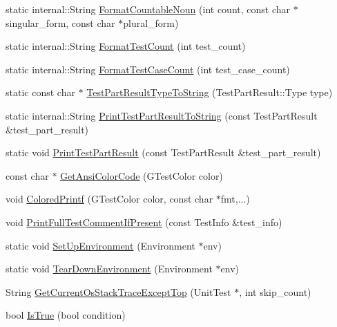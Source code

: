 \begin{DoxyCompactItemize}
\item 
static internal\-::\-String \hyperlink{namespacetesting_aefca65bdfcf981c1e55c7d90e14a263f}{\-Format\-Countable\-Noun} (int count, const char $\ast$singular\-\_\-form, const char $\ast$plural\-\_\-form)
\item 
static internal\-::\-String \hyperlink{namespacetesting_a9e35e748b0be521a7c14047d3cab12b2}{\-Format\-Test\-Count} (int test\-\_\-count)
\item 
static internal\-::\-String \hyperlink{namespacetesting_a62a889fb8f600d386c9c75951b0a45b7}{\-Format\-Test\-Case\-Count} (int test\-\_\-case\-\_\-count)
\item 
static const char $\ast$ \hyperlink{namespacetesting_a3095c11c161dad676777579f3619d016}{\-Test\-Part\-Result\-Type\-To\-String} (\-Test\-Part\-Result\-::\-Type type)
\item 
static internal\-::\-String \hyperlink{namespacetesting_aa72a7aad5f2a9ccde41699f09348160a}{\-Print\-Test\-Part\-Result\-To\-String} (const \-Test\-Part\-Result \&test\-\_\-part\-\_\-result)
\item 
static void \hyperlink{namespacetesting_af2baf2fe4307d85e2124466614b0108a}{\-Print\-Test\-Part\-Result} (const \-Test\-Part\-Result \&test\-\_\-part\-\_\-result)
\item 
const char $\ast$ \hyperlink{namespacetesting_1_1internal_a381864cc8cad6df85e53dcee3b0cea92}{\-Get\-Ansi\-Color\-Code} (\-G\-Test\-Color color)
\item 
void \hyperlink{namespacetesting_1_1internal_a50a94fd99435d0a4dc57b7ca17860d92}{\-Colored\-Printf} (\-G\-Test\-Color color, const char $\ast$fmt,...)
\item 
void \hyperlink{namespacetesting_1_1internal_a75563c3d082e5343e8da2bad4e813b4d}{\-Print\-Full\-Test\-Comment\-If\-Present} (const \-Test\-Info \&test\-\_\-info)
\item 
static void \hyperlink{namespacetesting_1_1internal_a70bc8320887c024883c4350b40891a1f}{\-Set\-Up\-Environment} (\-Environment $\ast$env)
\item 
static void \hyperlink{namespacetesting_1_1internal_ad03ec49f30777e3940aac9bd7ee087fd}{\-Tear\-Down\-Environment} (\-Environment $\ast$env)
\item 
\-String \hyperlink{namespacetesting_1_1internal_aa233c580f5aa0ac5abf54608bc3366bc}{\-Get\-Current\-Os\-Stack\-Trace\-Except\-Top} (\-Unit\-Test $\ast$, int skip\-\_\-count)
\item 
bool \hyperlink{namespacetesting_1_1internal_a68c8009eb16c787f90cd989f57fb3a9a}{\-Is\-True} (bool condition)

\end{DoxyCompactItemize}

